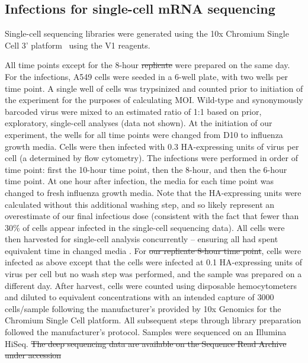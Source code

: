 \documentclass[9pt,lineno]{elife}
\newcommand{\jdbcomment}[1]{\emph{\color{red} [#1]}}
\providecommand{\DIFadd}[1]{{\protect\color{blue}\uwave{#1}}} %
\providecommand{\DIFdel}[1]{{\protect\color{red}\sout{#1}}}                      %
\providecommand{\DIFaddbegin}{} %
\providecommand{\DIFaddend}{} %
\providecommand{\DIFdelbegin}{} %
\providecommand{\DIFdelend}{} %
\begin{document}
\subsection{Infections for single-cell mRNA sequencing}
Single-cell sequencing libraries were generated using the 10x Chromium Single Cell 3' platform~\citep{zheng2017massively} using the V1 reagents.

All time points except for the \DIFaddbegin \DIFadd{second }\DIFaddend 8-hour \DIFdelbegin \DIFdel{replicate }\DIFdelend \DIFaddbegin \DIFadd{sample (8hr-2) }\DIFaddend were prepared on the same day.
For the infections, A549 cells were seeded in a 6-well plate, with two wells per time point. 
A single well of cells was trypsinized and counted prior to initiation of the experiment for the purposes of calculating MOI.
Wild-type and synonymously barcoded virus were mixed to an estimated ratio of 1:1 based on prior, exploratory, single-cell analyses (data not shown). 
At the initiation of our experiment, the wells for all time points were changed from D10 to influenza growth media.
Cells were then infected with 0.3 HA-expressing units of virus per cell (a determined by flow cytometry).
The infections were performed in order of time point: first the 10-hour time point, then the 8-hour, and then the 6-hour time point.
At one hour after infection, the media for each time point was changed to fresh influenza growth media.
Note that the HA-expressing units were calculated without this additional washing step, and so likely represent an overestimate of our final infectious dose (consistent with the fact that fewer than 30\% of cells appear infected in the single-cell sequencing data).
All cells were then harvested for single-cell analysis concurrently -- ensuring all had spent equivalent time in changed media .
For \DIFdelbegin \DIFdel{our replicate 8-hour time point}\DIFdelend \DIFaddbegin \DIFadd{8hr-2 sample}\DIFaddend , cells were infected as above except that the cells were infected at 0.1 HA-expressing units of virus per cell but no wash step was performed, and the sample was prepared on a different day.
After harvest, cells were counted using disposable hemocytometers and diluted to equivalent concentrations with an intended capture of 3000 cells/sample following the manufacturer's provided by 10x Genomics for the Chromium Single Cell platform.
All subsequent steps through library preparation followed the manufacturer's protocol.
Samples were sequenced on an Illumina HiSeq. 
\DIFdelbegin \DIFdel{The deep sequencing data are available on the Sequence Read Archive under accession }%
\DIFdelend 
\end{document}
